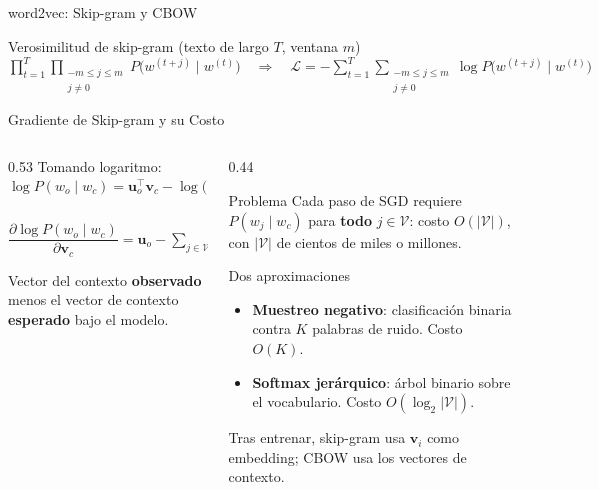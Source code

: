 \documentclass[aspectratio=169, 10pt]{beamer}
\newcommand{\V}{\mathcal{V}}
\newcommand{\formula}[1]{%
	\begin{tcolorbox}[colback=UCMBlue!8, colframe=UCMBlue, arc=4pt,
		boxsep=2pt, left=6pt, right=6pt, top=3pt, bottom=3pt]
		#1
	\end{tcolorbox}
}
\begin{document}
\begin{frame}[shrink]{word2vec: Skip-gram y CBOW}
	\vspace{0.2cm}

	\begin{block}{Verosimilitud de skip-gram (texto de largo $T$, ventana $m$)}
		\centering
		$\displaystyle \prod_{t=1}^{T} \prod_{\substack{-m\le j\le m\\ j\ne 0}} P\big(w^{(t+j)} \mid w^{(t)}\big)
			\quad\Longrightarrow\quad
			\mathcal{L} = -\sum_{t=1}^{T} \sum_{\substack{-m\le j\le m\\ j\ne 0}} \log P\big(w^{(t+j)} \mid w^{(t)}\big)$
	\end{block}

\end{frame}

\begin{frame}{Gradiente de Skip-gram y su Costo}

	\begin{columns}[T]
		\begin{column}{0.53\textwidth}
			Tomando logaritmo:
			\[
				\log P(w_o\mid w_c) = \mathbf{u}_o^\top \mathbf{v}_c - \log\Big(\sum_{i\in\V}\exp(\mathbf{u}_i^\top \mathbf{v}_c)\Big)
			\]
			\formula{\centering $\dfrac{\partial \log P(w_o\mid w_c)}{\partial \mathbf{v}_c} = \mathbf{u}_o - \displaystyle\sum_{j\in\V} P(w_j \mid w_c)\,\mathbf{u}_j$}
			\small
			Vector del contexto \textbf{observado} menos el vector de contexto \textbf{esperado} bajo el modelo.
		\end{column}

		\begin{column}{0.44\textwidth}
			\begin{alertblock}{Problema}
				\small
				Cada paso de SGD requiere $P(w_j\mid w_c)$ para \textbf{todo} $j\in\V$: costo $O(|\V|)$, con $|\V|$ de cientos de miles o millones.
			\end{alertblock}

			\begin{block}{Dos aproximaciones}
				\small
				\begin{itemize}
					\item \textbf{Muestreo negativo}: clasificaci\'on binaria contra $K$ palabras de ruido. Costo $O(K)$.
					\item \textbf{Softmax jer\'arquico}: \'arbol binario sobre el vocabulario. Costo $O(\log_2 |\V|)$.
				\end{itemize}
			\end{block}

			{\scriptsize Tras entrenar, skip-gram usa $\mathbf{v}_i$ como embedding; CBOW usa los vectores de contexto.}
		\end{column}
	\end{columns}

\end{frame}
\end{document}
